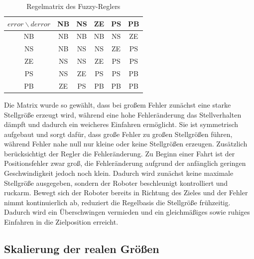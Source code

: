 \begin{table}[H]
    \centering
    \caption{Regelmatrix des Fuzzy-Reglers}
    \label{tab:regelmatrix}
    \begin{tabular}{c|ccccc}
        \toprule
        $error \backslash derror$ & NB & NS & ZE & PS & PB \\
        \midrule
        NB & NB & NB & NB & NS & ZE \\
        NS & NB & NS & NS & ZE & PS \\
        ZE & NS & NS & ZE & PS & PS \\
        PS & NS & ZE & PS & PS & PB \\
        PB & ZE & PS & PB & PB & PB \\
        \bottomrule
    \end{tabular}
\end{table}

Die Matrix wurde so gewählt, dass bei großem Fehler zunächst eine starke Stellgröße erzeugt wird, während eine hohe Fehleränderung das Stellverhalten dämpft und dadurch ein weicheres Einfahren ermöglicht. Sie ist symmetrisch aufgebaut und sorgt dafür, dass große Fehler zu großen Stellgrößen führen, während Fehler nahe null nur kleine oder keine Stellgrößen erzeugen. Zusätzlich berücksichtigt der Regler die Fehleränderung. Zu Beginn einer Fahrt ist der Positionsfehler zwar groß, die Fehleränderung aufgrund der anfänglich geringen Geschwindigkeit jedoch noch klein. Dadurch wird zunächst keine maximale Stellgröße ausgegeben, sondern der Roboter beschleunigt kontrolliert und ruckarm. Bewegt sich der Roboter bereits in Richtung des Zieles und der Fehler nimmt kontinuierlich ab, reduziert die Regelbasis die Stellgröße frühzeitig. Dadurch wird ein Überschwingen vermieden und ein gleichmäßiges sowie ruhiges Einfahren in die Zielposition erreicht.

\subsection{Skalierung der realen Größen}

